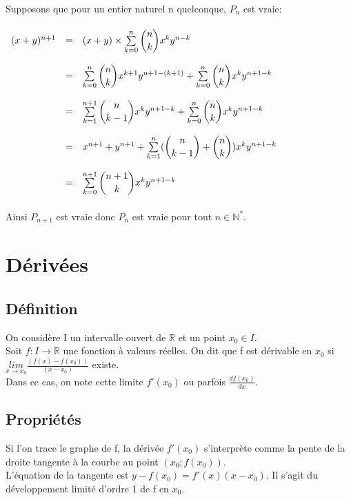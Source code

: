 \documentclass[a4paper,10pt]{book}
\newcommand{\R}{\mathbb{R}}
\newcommand{\N}{\mathbb{N}}
\begin{document}
Supposons que pour un entier naturel n quelconque, $P_{n}$ est vraie:\\\\
$\begin{array}{rcl} (x+y)^{n+1}&=&(x+y)\times \sum \limits_{k=0}^{n} \dbinom{n}{k} x^{k} y^{n-k}\\\\
&=&\sum \limits_{k=0}^{n} \dbinom{n}{k} x^{k+1} y^{n+1-(k+1)} + \sum \limits_{k=0}^{n} \dbinom{n}{k} x^{k} y^{n+1-k}\\\\
&=&\sum \limits_{k=1}^{n+1} \dbinom{n}{k-1} x^{k} y^{n+1-k}+ \sum \limits_{k=0}^{n} \dbinom{n}{k} x^{k} y^{n+1-k}\\\\
&=&x^{n+1}+y^{n+1}+\sum \limits_{k=1}^{n} (\dbinom{n}{k-1} + \dbinom{n}{k}) x^{k} y^{n+1-k}\\\\
&=&\sum \limits_{k=0}^{n+1} \dbinom{n+1}{k} x^{k} y^{n+1-k} \end{array}$\\\\

Ainsi $P_{n+1}$ est vraie donc $P_{n}$ est vraie pour tout $n \in \N^{*}$.

\section{Dérivées}
\subsection{Définition}
On considère I un intervalle ouvert de $\R$ et un point $x_{0} \in I$.\\
Soit $f : I \longrightarrow \R$ une fonction à valeurs réelles.
On dit que f est dérivable en $x_{0}$ si $\underset{x\rightarrow x_{0}}{lim} \frac{(f(x)-f(x_{0}))}{(x-x_{0})}$ existe.\\
Dans ce cas, on note cette limite $f'(x_{0})$ ou parfois $\frac{df(x_{0})}{dx}$.

\subsection{Propriétés}
Si l'on trace le graphe de f, la dérivée $f'(x_{0})$ s'interprète comme la pente de la droite tangente à la courbe au point $(x_{0};f(x_{0}))$.\\
L'équation de la tangente est $y-f(x_{0})=f'(x)(x-x_{0})$. Il s'agit du développement limité d'ordre 1 de f en $x_{0}$.\\ \\
\end{document}
